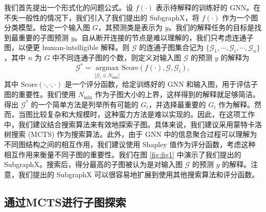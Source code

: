 \documentclass[final]{cvpr}
\begin{document}
我们首先提出一个形式化的问题公式。设 $f(\cdot)$ 表示待解释的训练好的 GNN。在不失一般性的情况下，我们引入了我们提出的 SubgraphX，将 $f(\cdot)$ 作为一个图分类模型。给定一个输入图 $G$，其预测类是表示为 $y$。我们的解释任务的目标是找到最重要的子图预测 $y$。自从断开连接的节点是难以理解的，我们只考虑连通子图，以便更 human-intelligible 解释。则 $\mathcal{G}$ 的连通子图集合记为 $\{\mathcal{G}_1,\cdots,\mathcal{G}_i,\cdots,\mathcal{G}_n\}$，其中 $n$ 为 $G$ 中不同连通子图的个数，则定义对输入图 $\mathcal{G}$ 的预测 $y$ 的解释为
%
\begin{equation}
\mathcal{G}^*=\mathop{\arg\max}\limits_{|\mathcal{G}_i\le N_{\min}|}\mathrm{Score}(f(\cdot),\mathcal{G},\mathcal{G}_i),
\end{equation}
%
其中 $\mathrm{Score}(\cdot,\cdot,\cdot)$ 是一个评分函数，给定训练好的 GNN 和输入图，用于评估子图的重要性。我们使用 $N_{\min}$ 作为子图大小的上界，这样得到的解释就足够简洁。得出 $\mathcal{G}^*$ 的一个简单方法是列举所有可能的 $G_i$，并选择最重要的 $G_i$ 作为解释。然而，当图比较复杂和大规模时，这种蛮力方法是难以实现的。因此，在这项工作中，我们建议结合搜索算法来有效地探索子图。具体来说，我们建议采用蒙特卡洛树搜索 (MCTS) 作为搜索算法。此外，由于 GNN 中的信息聚合过程可以理解为不同图结构之间的相互作用，我们建议使用 Shapley 值作为评分函数，考虑这种相互作用来衡量不同子图的重要性。我们在图 \ref{fig:fig1} 中演示了我们提出的 SubgraphX。搜索后，得分最高的子图被认为是对输入图 $\mathcal{G}$ 的预测 $y$ 的解释。注意，我们提出的 SubgraphX 可以很容易地扩展到使用其他搜索算法和评分函数。



\subsection{通过MCTS进行子图探索}
\end{document}
